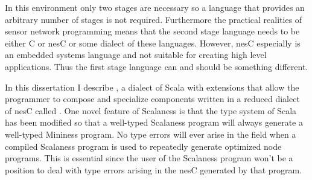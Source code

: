 In this environment only two stages are necessary so a language that provides an arbitrary
number of stages is not required. Furthermore the practical realities of sensor network
programming means that the second stage language needs to be either C or nesC
\cite{Gay-nesC-2003} or some dialect of these languages. However, nesC especially is an embedded
systems language and not suitable for creating high level applications. Thus the first stage
language can and should be something different.

In this dissertation I describe , a dialect of Scala \cite{PiS2} with
extensions that allow the programmer to compose and specialize components written in a reduced
dialect of nesC called . One novel feature of Scalaness is that the type
system of Scala has been modified so that a well-typed Scalaness program will always generate a
well-typed Mininess program. No type errors will ever arise in the field when a compiled
Scalaness program is used to repeatedly generate optimized node programs. This is essential
since the user of the Scalaness program won't be a position to deal with type errors arising
in the nesC generated by that program.


